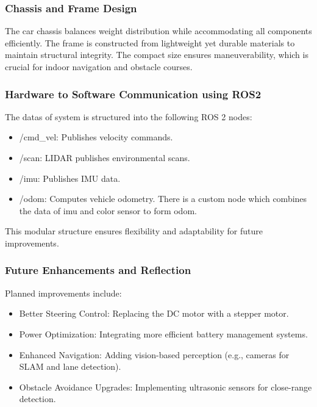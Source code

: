\documentclass[english,project]{buwthesis}
\begin{document}
\subsubsection{Chassis and Frame Design}

The car chassis balances weight distribution while accommodating all components efficiently. The frame is constructed from lightweight yet durable materials to maintain structural integrity. The compact size ensures maneuverability, which is crucial for indoor navigation and obstacle courses.


\subsubsection{Hardware to Software Communication using ROS2}

The data\textquotesingle s of system is structured into the following ROS 2 nodes:
\begin{itemize}
    \item /cmd\_vel: Publishes velocity commands.
    \item /scan: LIDAR publishes environmental scans.
    \item /imu: Publishes IMU data.
    \item /odom: Computes vehicle odometry. There is a custom node which combines the data of imu and color sensor to form odom.
\end{itemize}

This modular structure ensures flexibility and adaptability for future improvements.

\subsubsection{Future Enhancements and Reflection}

Planned improvements include:
\begin{itemize}
    \item Better Steering Control: Replacing the DC motor with a stepper motor.
    \item Power Optimization: Integrating more efficient battery management systems.
    \item Enhanced Navigation: Adding vision-based perception (e.g., cameras for SLAM and lane detection).
    \item Obstacle Avoidance Upgrades: Implementing ultrasonic sensors for close-range detection.


\end{itemize}
\end{document}
